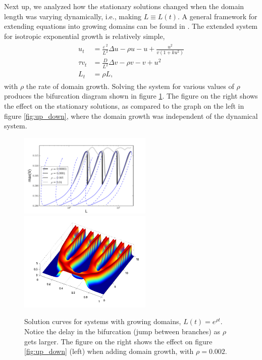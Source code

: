 \documentclass[a4paper,10pt]{article}
\newcommand{\De}{\ensuremath{\Delta}}
\newcommand{\Ep}{\ensuremath{\varepsilon\,}}
\begin{document}
Next up, we analyzed how the stationary solutions changed when the domain length was varying dynamically, i.e., making $L\equiv L(t)$. A general framework for extending equations into growing domains can be found in \cite{plaza2004growth}. The extended system for isotropic exponential growth is relatively simple, 
% 
\begin{equation}
\label{eqn:gms_growth}
\begin{split}
\begin{aligned}
	u_t &= \frac{\Ep^2}{L^2}\De u -\rho u - u +\frac{u^2}{v(1+ku^2)} \\
	\tau v_t &= \frac{D}{L^2}\De v - \rho v - v + u^2 \\
	L_t &= \rho L,
\end{aligned}
\end{split}
\end{equation}
% 
with $\rho$ the rate of domain growth. Solving the system for various values of $\rho$ produces the bifurcation diagram shown in figure \ref{fig:growth}. The figure on the right shows the effect on the stationary solutions, as compared to the graph on the left in figure \ref{fig:up_down}, where the domain growth was independent of the dynamical system.

% 
\begin{figure}[htb]
\begin{center}
\includegraphics[width=2.5in]{all_branches}\includegraphics[width=2.5in]{growing}
\caption{Solution curves for systems with growing domains, $L(t)=e^{\rho t}$. Notice the delay in the bifurcation (jump between branches) as $\rho$ gets larger. The figure on the right shows the effect on figure \ref{fig:up_down} (left) when adding domain growth, with $\rho=0.002$.}
\label{fig:growth}
\end{center}
\end{figure}
% 
\end{document}
